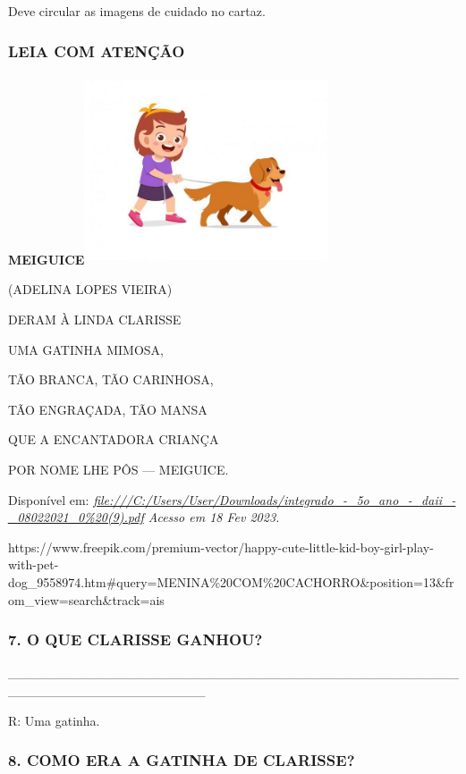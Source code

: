 Deve circular as imagens de cuidado no cartaz.

\subsubsection{LEIA COM ATENÇÃO}\label{leia-com-atenuxe7uxe3o}

\textbf{MEIGUICE}\includegraphics[width=2.83472in,height=2.19792in]{media/image128.jpg}

(ADELINA LOPES VIEIRA)

DERAM À LINDA CLARISSE

\protect\hypertarget{_heading=h.44sinio}{}{}UMA GATINHA MIMOSA,

TÃO BRANCA, TÃO CARINHOSA,

TÃO ENGRAÇADA, TÃO MANSA

QUE A ENCANTADORA CRIANÇA

POR NOME LHE PÔS --- MEIGUICE.

Disponível em:
\emph{\href{about:blank}{file:///C:/Users/User/Downloads/integrado\_-\_5o\_ano\_-\_daii\_-\_08022021\_0\%20(9).pdf}
Acesso em 18 Fev 2023.}

https://www.freepik.com/premium-vector/happy-cute-little-kid-boy-girl-play-with-pet-dog\_9558974.htm\#query=MENINA\%20COM\%20CACHORRO\&position=13\&from\_view=search\&track=ais

\subsubsection{7. O QUE CLARISSE GANHOU?}\label{o-que-clarisse-ganhou}

\_\_\_\_\_\_\_\_\_\_\_\_\_\_\_\_\_\_\_\_\_\_\_\_\_\_\_\_\_\_\_\_\_\_\_\_\_\_\_\_\_\_\_\_\_\_\_\_\_\_\_\_\_\_\_\_\_\_\_\_\_\_\_\_\_\_\_\_\_

R: Uma gatinha.

\subsubsection{8. COMO ERA A GATINHA DE
CLARISSE?}\label{como-era-a-gatinha-de-clarisse}

